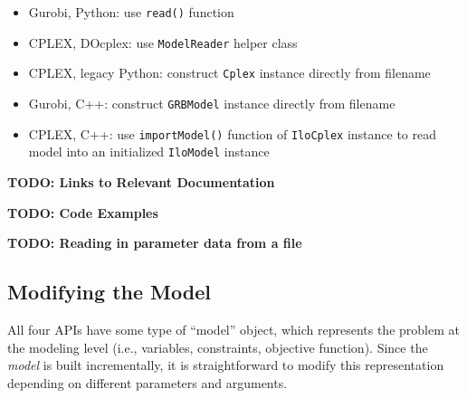 \documentclass[12pt]{article}
\newcommand\red[1]{{\color{red}#1}}
\begin{document}
\begin{itemize}
    \item Gurobi, Python: use \texttt{read()} function
    \item CPLEX, DOcplex: use \texttt{ModelReader} helper class
    \item CPLEX, legacy Python: construct \texttt{Cplex} instance directly from filename
    \item Gurobi, C++: construct \texttt{GRBModel} instance directly from filename
    \item CPLEX, C++: use \texttt{importModel()} function of \texttt{IloCplex} instance to read model into an initialized \texttt{IloModel} instance
\end{itemize}

\red{\textbf{TODO: Links to Relevant Documentation}}

\red{\textbf{TODO: Code Examples}}


\red{\textbf{TODO: Reading in parameter data from a file}}

\subsection{Modifying the Model}
All four APIs have some type of ``model'' object, which represents the problem at the modeling level (i.e., variables, constraints, objective function). Since the \emph{model} is built incrementally, it is straightforward to modify this representation depending on different parameters and arguments.
\end{document}
